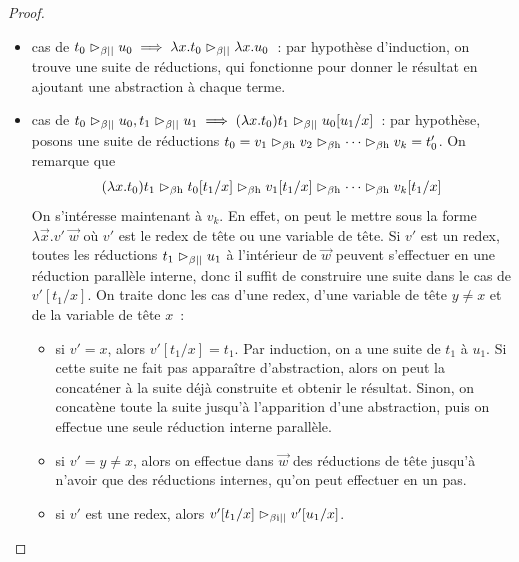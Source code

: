 \begin{proof}
\begin{itemize}
\begin{itemize}
      On sait que $t_1 \redPar u_1$. De plus, par hypothèse,
      $v_{k_0} \redPar u'$, donc
      $(\lambda x.v_{k_0})\IredPar (\lambda x.u')\;u_1$.
    \item s'il n'existe pas de tel $k_0$, alors on en déduit que
      $t_0\;t_1 \Hred v_1\;t_1\Hred\cdots \Hred v_k\;t_1$, et
      par hypothèse $t_1 \redPar u_1$ et $v_k = t'_0 \IredPar u_0$, donc
      $v_k\;t_1\IredPar u$.
    \end{itemize}
    D'où le résultat.
  \item cas de $t_0 \mathrel{\rhd_{\mathord{\beta}\mathord{||}}} u_0 \implies \lambda x.t_0\mathrel{\rhd_{\mathord{\beta}\mathord{||}}} \lambda x.u_0$~:
    par hypothèse d'induction, on trouve une suite de réductions, qui
    fonctionne pour donner le résultat en ajoutant une abstraction à chaque
    terme.
  \item cas de $t_0\mathrel{\rhd_{\mathord{\beta}\mathord{||}}} u_0, t_1\mathrel{\rhd_{\mathord{\beta}\mathord{||}}} u_1 \implies
    (\lambda x.t_0)t_1\mathrel{\rhd_{\mathord{\beta}\mathord{||}}} u_0[u_1/x]$~:
    par hypothèse, posons une suite de réductions
    $t_0 = v_1 \mathrel{\rhd_{\beta\mathrm{h}}} v_2 \mathrel{\rhd_{\beta\mathrm{h}}}\cdots \mathrel{\rhd_{\beta\mathrm{h}}} v_k = t'_0$.
    On remarque que
    \[(\lambda x.t_0)t_1 \mathrel{\rhd_{\beta\mathrm{h}}} t_0[t_1/x] \mathrel{\rhd_{\beta\mathrm{h}}} v_1[t_1/x] \mathrel{\rhd_{\beta\mathrm{h}}}\cdots
    \mathrel{\rhd_{\beta\mathrm{h}}} v_k[t_1/x]\]
    On s'intéresse maintenant à $v_k$. En effet, on peut le mettre sous la
    forme $\lambda \vec x.v'\;\vec{w}$ où $v'$ est le redex de tête ou une
    variable de tête. Si $v'$ est un redex, toutes les réductions
    $t_1 \redPar u_1$ à l'intérieur de $\vec{w}$ peuvent s'effectuer en une
    réduction parallèle interne, donc il suffit de construire une suite dans
    le cas de $v'[t_1/x]$. On traite donc les cas d'une redex, d'une variable
    de tête $y \neq x$ et de la variable de tête $x$~:
    \begin{itemize}
    \item si $v' = x$, alors $v'[t_1/x] = t_1$. Par induction, on a
      une suite de $t_1$ à $u_1$. Si cette suite ne fait pas apparaître
      d'abstraction, alors on peut la concaténer à la suite déjà
      construite et obtenir le résultat. Sinon, on concatène toute la
      suite jusqu'à l'apparition d'une abstraction, puis on effectue une
      seule réduction interne parallèle.
    \item si $v' = y \neq x$, alors on effectue dans $\vec{w}$ des
      réductions de tête jusqu'à n'avoir que des réductions internes,
      qu'on peut effectuer en un pas.
    \item si $v'$ est une redex, alors $v'[t_1/x] \mathrel{\rhd_{\beta\mathrm{i}{\mathord{||}}}} v'[u_1/x]$.
      \qedhere
    \end{itemize}
  \end{itemize}
\end{proof}

